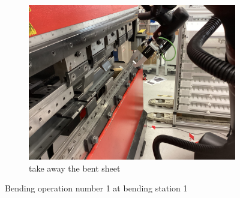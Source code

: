 \begin{figure}[h]
\begin{subfigure}[b]{0.32\textwidth}
    \end{subfigure}\hspace{0.1cm}
    \begin{subfigure}[b]{0.32\textwidth}
        \centering
        \includegraphics[width=\textwidth]{figures/bending/bending1-001.png}
        \caption{take away the bent sheet}
        \label{subfig:bending1-after}
    \end{subfigure}\hspace{0.1cm}
    \caption{Bending operation number 1 at bending station 1}
    \label{fig:bending-operation-1}
\end{figure}

